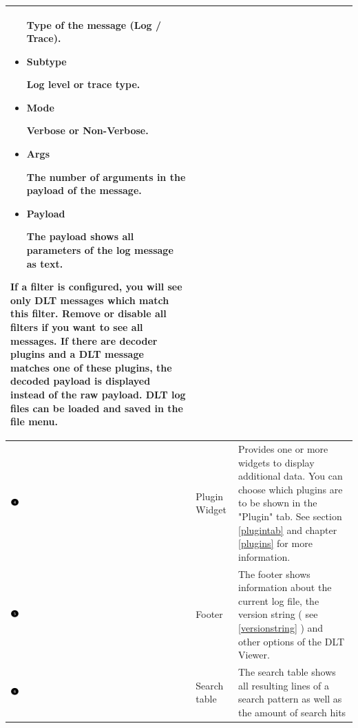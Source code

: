 \documentclass[a4paper,11pt]{article}
\begin{document}
\begin{longtable}{| l | m{3cm}  | m{11cm} |}
\begin{itemize}
    Type of the message (Log / Trace).
   \item \begin{bf}Subtype\end{bf}
    Log level or trace type.
   \item \begin{bf}Mode\end{bf}
    Verbose or Non-Verbose.
   \item \begin{bf}Args\end{bf}
    The number of arguments in the payload of the message.
   \item \begin{bf}Payload\end{bf}
    The payload shows all parameters of the log message as text.
  \end{itemize}
If a filter is configured, you will see only DLT messages which match
this filter. Remove or disable all filters if you want to see all messages.
If there are decoder plugins and a DLT message matches one of these plugins, the decoded
payload is displayed instead of the raw payload.
DLT log files can be loaded and saved in the file menu.
 \\
   \hline
   \includegraphics[width=0.05\textwidth]{images/Mark4.png}
   & Plugin Widget
   & Provides one or more widgets to display additional data. You can choose which plugins are to be shown in the "Plugin" tab.
   See section \autoref{plugintab} and chapter \autoref{plugins} for more information.   \\
   \hline
   \includegraphics[width=0.05\textwidth]{images/Mark5.png}
   & Footer
   & \label{footer}The footer shows information about the current log file,
     the version string ( see \autoref{versionstring} ) and other options of the DLT Viewer. \\
   \hline
   \includegraphics[width=0.05\textwidth]{images/Mark6.png}
    & Search table
    & \label{searchtable}The search table shows all resulting lines of a search pattern as well as the amount of search hits \\
   \hline

\end{longtable}
\end{document}
